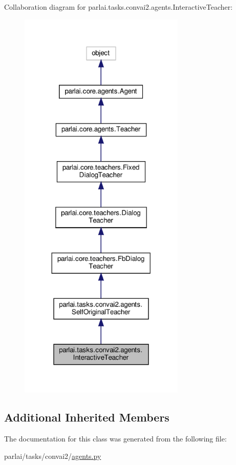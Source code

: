Collaboration diagram for parlai.\+tasks.\+convai2.\+agents.\+Interactive\+Teacher\+:
\nopagebreak
\begin{figure}[H]
\begin{center}
\leavevmode
\includegraphics[width=224pt]{classparlai_1_1tasks_1_1convai2_1_1agents_1_1InteractiveTeacher__coll__graph}
\end{center}
\end{figure}
\subsection*{Additional Inherited Members}


The documentation for this class was generated from the following file\+:\begin{DoxyCompactItemize}
\item 
parlai/tasks/convai2/\hyperlink{parlai_2tasks_2convai2_2agents_8py}{agents.\+py}\end{DoxyCompactItemize}
